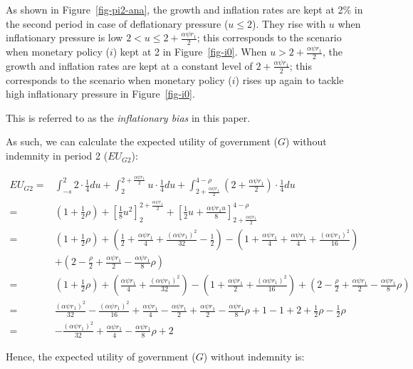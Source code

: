 \documentclass[
  a4paper,
  abstract=true]{scrartcl}
\theoremstyle{definition}
\begin{document}
As shown in Figure~\ref{fig-pi2-ana}, the growth and inflation rates are
kept at 2\% in the second period in case of deflationary pressure
(\(u\leq2\)). They rise with \(u\) when inflationary pressure is low
\(2<u\leq2+\frac{\alpha\psi r_1}{2}\); this corresponds to the scenario
when monetary policy (\(i\)) kept at 2 in Figure~\ref{fig-i0}. When
\(u>2+\frac{\alpha\psi r_1}{2}\), the growth and inflation rates are
kept at a constant level of \(2+\frac{\alpha\psi r_1}{2}\); this
corresponds to the scenario when monetary policy (\(i\)) rises up again
to tackle high inflationary pressure in Figure~\ref{fig-i0}.

This is referred to as the \emph{inflationary bias} in this paper.

\inflationary*

As such, we can calculate the expected utility of government (\(G\))
without indemnity in period 2 (\(EU_{G2}\)):

\begin{align*}
EU_{G2}=&\int_{-s}^2 2\cdot \frac{1}{4}du+\int_{2}^{2+\frac{\alpha\psi r_1}{2}}u\cdot\frac{1}{4}du+\int_{2+\frac{\alpha\psi r_1}{2}}^{4-\rho}(2+\frac{\alpha\psi r_1}{2})\cdot\frac{1}{4}du\\
=&(1+\frac{1}{2}\rho)+[\frac{1}{8}u^2]_{2}^{2+\frac{\alpha\psi r_1}{2}}+[\frac{1}{2}u+\frac{\alpha\psi r_1u}{8}]_{2+\frac{\alpha\psi r_1}{2}}^{4-\rho}\\
=&(1+\frac{1}{2}\rho)+(\frac{1}{2}+\frac{\alpha\psi r_1}{4}+\frac{(\alpha\psi r_1)^2}{32}-\frac{1}{2})-(1+\frac{\alpha\psi r_1}{4}+\frac{\alpha\psi r_1}{4}+\frac{(\alpha\psi r_1)^2}{16})\\
&+(2-\frac{\rho}{2}+\frac{\alpha\psi r_1}{2}-\frac{\alpha\psi r_1}{8}\rho)\\
=&(1+\frac{1}{2}\rho)+(\frac{\alpha\psi r_1}{4}+\frac{(\alpha\psi r_1)^2}{32})-(1+\frac{\alpha\psi r_1}{2}+\frac{(\alpha\psi r_1)^2}{16})+(2-\frac{\rho}{2}+\frac{\alpha\psi r_1}{2}-\frac{\alpha\psi r_1}{8}\rho)\\
=&\frac{(\alpha\psi r_1)^2}{32}-\frac{(\alpha\psi r_1)^2}{16}+\frac{\alpha\psi r_1}{4}-\frac{\alpha\psi r_1}{2}+\frac{\alpha\psi r_1}{2}-\frac{\alpha\psi r_1}{8}\rho+1-1+2+\frac{1}{2}\rho-\frac{1}{2}\rho\\
=&-\frac{(\alpha\psi r_1)^2}{32}+\frac{\alpha\psi r_1}{4}-\frac{\alpha\psi r_1}{8}\rho+2
\end{align*}

Hence, the expected utility of government (\(G\)) without indemnity is:
\end{document}
